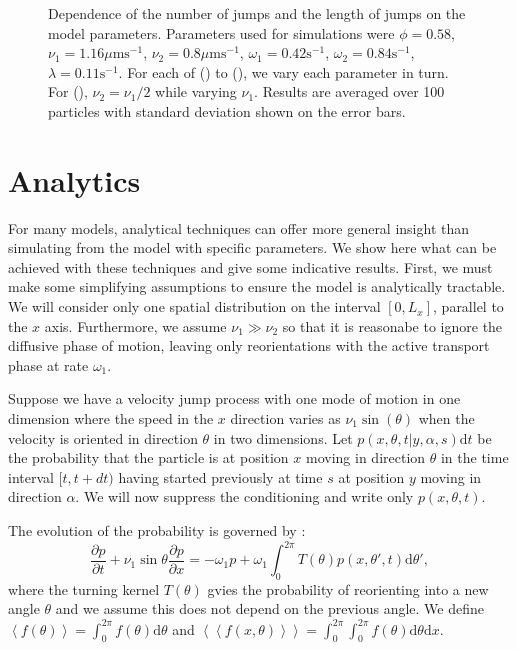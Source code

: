 \documentclass[twocolumn]{biophys}
\def\mean#1{\left< #1 \right>}
\begin{document}
\begin{figure*}
        \caption{ \small Dependence of the number of jumps and the length of jumps on the model parameters. Parameters used for simulations were $\phi=0.58$, $\nu_1=1.16 \mu \text{ms}^{-1}$, $\nu_2=0.8 \mu \text{ms}^{-1}$, $\omega_1=0.42 \text{s}^{-1}$, $\omega_2=0.84 \text{s}^{-1}$, $\lambda=0.11 \text{s}^{-1}$.
        For each of () to (), we vary each parameter in turn. 
        For (), $\nu_2=\nu_1 / 2$ while varying $\nu_1$. Results are averaged over 100 particles with standard deviation shown on the error bars.}
        \label{FIG:Sensitivity_analysis_2}
    \end{figure*}

    \section{Analytics}
For many models, analytical techniques can offer more general insight than simulating from the model with specific parameters.
We show here what can be achieved with these techniques and give some indicative results.
First, we must make some simplifying assumptions to ensure the model is analytically tractable. We will consider only one spatial distribution on the interval $[0,L_x]$, parallel to the $x$ axis.
Furthermore, we assume $\nu_1 \gg \nu_2$ so that it is reasonabe to ignore the diffusive phase of motion, leaving only reorientations with the active transport phase at rate $\omega_1$.

Suppose we have a velocity jump process with one mode of motion in one dimension where the speed in the $x$ direction varies as $\nu_1 \sin (\theta)$ when the velocity is oriented in direction $\theta$ in two dimensions.
Let $ p(x,\theta,t | y, \alpha, s)\text{d}t$ be the probability that the particle is at position $x$ moving in direction $\theta$ in the time interval $[t,t+dt)$ having started previously at time $s$ at position $y$ moving in direction $\alpha$.
We will now suppress the conditioning and write only $ p(x,\theta, t) $.

The evolution of the probability is governed \citep{othmer1988models} by :
\begin{equation}\label{Evolution}
 \frac{\partial p}{\partial t} + \nu_1 \sin{\theta } \frac{\partial p}{\partial x} = -\omega_1 p + \omega_1 \int_0^{2\pi} T(\theta) p(x,\theta ', t) \text{d} \theta ',
\end{equation}
where the turning kernel $T(\theta)$ gvies the probability of reorienting into a new angle $\theta$ and we assume this does not depend on the previous angle.
We define $\mean{f(\theta)} = \int_0^{2\pi} f(\theta) \text{d} \theta $ and $\mean{\mean{f(x,\theta)}} =  \int_{0}^{2\pi} \int_0^{2\pi} f(\theta) \text{d} \theta \text{d}  x $.
\end{document}
